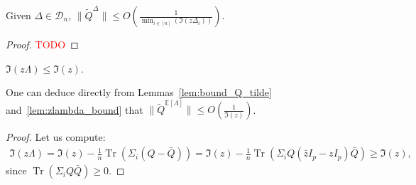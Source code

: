 \documentclass[ECP, preprint]{ejpecp} %
\DeclareMathOperator{\tr}{Tr}
\begin{document}
\begin{lemma}\label{lem:bound_Q_tilde}
    Given $\Delta \in \mathcal D_n$, $\|\tilde Q^{\Delta}\|\leq O \left( \frac{1}{\min_{i\in [n]}(\Im(z\Delta_i))} \right)$.
\end{lemma}
\begin{proof}
    \textcolor{red}{TODO}
\end{proof}
\begin{lemma}\label{lem:zlambda_bound}
    $\Im(z\Lambda) \leq \Im(z)$.
\end{lemma}
One can deduce directly from Lemmas~\ref{lem:bound_Q_tilde} and~\ref{lem:zlambda_bound} that $\|\tilde Q^{\mathbb E[\Lambda]}\|\leq O \left( \frac{1}{\Im(z)} \right)$.
\begin{proof}
    Let us compute:
    \begin{align*}
        \Im(z\Lambda)
        = \Im(z) - \frac{1}{n}\tr \left( \Sigma_i (Q-\bar Q) \right)
        = \Im(z) - \frac{1}{n}\tr \left( \Sigma_i Q (\bar zI_p- zI_p)\bar Q \right)
        \geq \Im(z),
    \end{align*}
    since $\tr \left( \Sigma_i Q\bar Q \right)\geq 0$.
\end{proof}
\end{document}
